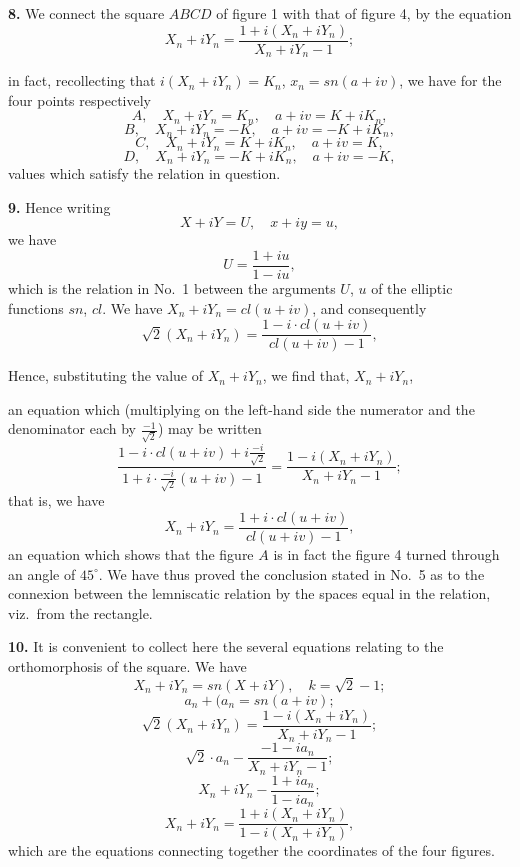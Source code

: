 \documentclass[11pt,a4paper]{book}
\begin{document}
\textbf{8.} We connect the square $ABCD$ of figure 1 with that of figure 4, by the equation
\[
X_n + iY_n = \frac{1 + i(X_n + iY_n)}{X_n + iY_n - 1};
\]

in fact, recollecting that $i (X_n + i Y_n) = K_n$, $x_n = sn (a + iv)$, we have for the four points respectively
\[
A, \quad X_n + iY_n = K_n, \quad a + iv = K + iK_n,
\]
\[
B, \quad X_n + iY_n = - K, \quad a + iv = - K + iK_n,
\]
\[
C, \quad X_n + iY_n = K + iK_n, \quad a + iv = K,
\]
\[
D, \quad X_n + iY_n = - K + iK_n, \quad a + iv = - K,
\]
values which satisfy the relation in question.

\textbf{9.} Hence writing
\[
X + iY = U, \quad x + iy = u,
\]
we have
\[
U = \frac{1 + iu}{1 - iu},
\]
which is the relation in No.\ 1 between the arguments $U$, $u$ of the elliptic functions $sn$, $cl$. We have $X_n + iY_n = cl (u + iv)$, and consequently
\[
\sqrt{2}(X_n + iY_n) = \frac{1 - i \cdot cl (u + iv)}{cl (u + iv) - 1},
\]

Hence, substituting the value of $X_n + iY_n$, we find that, $X_n + iY_n$,

an equation which (multiplying on the left-hand side the numerator and the denominator each by $\frac{- 1}{\sqrt{2}}$) may be written
\[
\frac{1 - i \cdot cl (u + iv) + i \frac{- i}{\sqrt{2}}}{1 + i \cdot \frac{- i}{\sqrt{2}}(u + iv) - 1} = \frac{1 - i(X_n + iY_n)}{X_n + iY_n - 1};
\]
that is, we have
\[
X_n + iY_n = \frac{1 + i \cdot cl (u + iv)}{cl (u + iv) - 1},
\]
an equation which shows that the figure $A$ is in fact the figure 4 turned through an angle of $45^\circ$. We have thus proved the conclusion stated in No.\ 5 as to the connexion between the lemniscatic relation by the spaces equal in the relation, viz.\ from the rectangle.

\textbf{10.} It is convenient to collect here the several equations relating to the orthomorphosis of the square. We have
\[
X_n + iY_n = sn (X + iY), \quad k = \sqrt{2} - 1;
\]
\[
a_n + (a_n = sn(a + iv);
\]
\[
\sqrt{2}(X_n + iY_n) = \frac{1 - i(X_n + iY_n)}{X_n + iY_n - 1};
\]
\[
\sqrt{2} \cdot a_n - \frac{- 1 - i a_n}{X_n + iY_n - 1};
\]
\[
X_n + iY_n - \frac{1 + ia_n}{1 - ia_n};
\]
\[
X_n + iY_n = \frac{1 + i(X_n + iY_n)}{1 - i(X_n + iY_n)},
\]
which are the equations connecting together the coordinates of the four figures.
\end{document}
